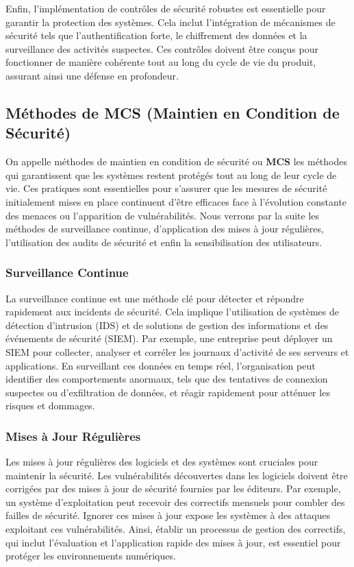 Enfin, l'implémentation de contrôles de sécurité robustes est essentielle pour garantir la protection des systèmes. Cela inclut l'intégration de mécanismes de sécurité tels que l'authentification forte, le chiffrement des données et la surveillance des activités suspectes. Ces contrôles doivent être conçus pour fonctionner de manière cohérente tout au long du cycle de vie du produit, assurant ainsi une défense en profondeur.

\subsection{Méthodes de MCS (Maintien en Condition de Sécurité)}

On appelle méthodes de maintien en condition de sécurité ou \textbf{MCS} les méthodes qui garantissent que les systèmes restent protégés tout au long de leur cycle de vie. Ces pratiques sont essentielles pour s'assurer que les mesures de sécurité initialement mises en place continuent d'être efficaces face à l'évolution constante des menaces ou l'apparition de vulnérabilités.
Nous verrons par la suite les méthodes de surveillance continue, d'application des mises à jour régulières, l'utilisation des audits de sécurité et enfin la sensibilisation des utilisateurs.

\subsubsection{Surveillance Continue}

La surveillance continue est une méthode clé pour détecter et répondre rapidement aux incidents de sécurité. Cela implique l'utilisation de systèmes de détection d'intrusion (IDS) et de solutions de gestion des informations et des événements de sécurité (SIEM). Par exemple, une entreprise peut déployer un SIEM pour collecter, analyser et corréler les journaux d'activité de ses serveurs et applications. En surveillant ces données en temps réel, l'organisation peut identifier des comportements anormaux, tels que des tentatives de connexion suspectes ou d'exfiltration de données, et réagir rapidement pour atténuer les risques et dommages.

\subsubsection{Mises à Jour Régulières}

Les mises à jour régulières des logiciels et des systèmes sont cruciales pour maintenir la sécurité. Les vulnérabilités découvertes dans les logiciels doivent être corrigées par des mises à jour de sécurité fournies par les éditeurs. Par exemple, un système d'exploitation peut recevoir des correctifs mensuels pour combler des failles de sécurité. Ignorer ces mises à jour expose les systèmes à des attaques exploitant ces vulnérabilités. Ainsi, établir un processus de gestion des correctifs, qui inclut l'évaluation et l'application rapide des mises à jour, est essentiel pour protéger les environnements numériques.

